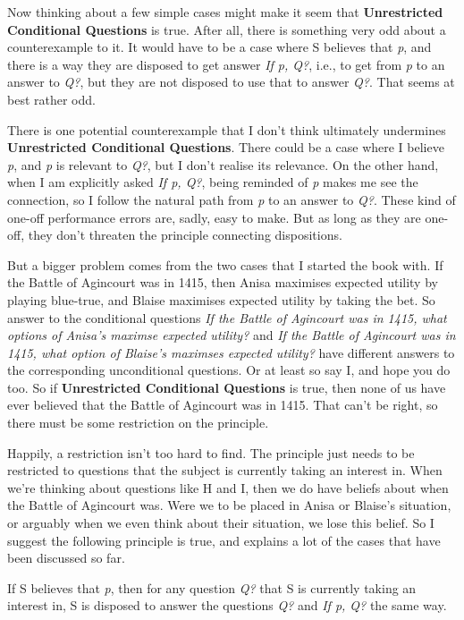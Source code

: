 \documentclass[
  11pt,
]{book}
\providecommand{\tightlist}{%
  \setlength{\itemsep}{0pt}\setlength{\parskip}{0pt}}
\begin{document}
Now thinking about a few simple cases might make it seem that \textbf{Unrestricted Conditional Questions} is true. After all, there is something very odd about a counterexample to it. It would have to be a case where S believes that \emph{p}, and there is a way they are disposed to get answer \emph{If p, Q?}, i.e., to get from \emph{p} to an answer to \emph{Q?}, but they are not disposed to use that to answer \emph{Q?}. That seems at best rather odd.

There is one potential counterexample that I don't think ultimately undermines \textbf{Unrestricted Conditional Questions}. There could be a case where I believe \emph{p}, and \emph{p} is relevant to \emph{Q?}, but I don't realise its relevance. On the other hand, when I am explicitly asked \emph{If p, Q?}, being reminded of \emph{p} makes me see the connection, so I follow the natural path from \emph{p} to an answer to \emph{Q?}. These kind of one-off performance errors are, sadly, easy to make. But as long as they are one-off, they don't threaten the principle connecting dispositions.

But a bigger problem comes from the two cases that I started the book with. If the Battle of Agincourt was in 1415, then Anisa maximises expected utility by playing blue-true, and Blaise maximises expected utility by taking the bet. So answer to the conditional questions \emph{If the Battle of Agincourt was in 1415, what options of Anisa's maximse expected utility?} and \emph{If the Battle of Agincourt was in 1415, what option of Blaise's maximses expected utility?} have different answers to the corresponding unconditional questions. Or at least so say I, and hope you do too. So if \textbf{Unrestricted Conditional Questions} is true, then none of us have ever believed that the Battle of Agincourt was in 1415. That can't be right, so there must be some restriction on the principle.

Happily, a restriction isn't too hard to find. The principle just needs to be restricted to questions that the subject is currently taking an interest in. When we're thinking about questions like H and I, then we do have beliefs about when the Battle of Agincourt was. Were we to be placed in Anisa or Blaise's situation, or arguably when we even think about their situation, we lose this belief. So I suggest the following principle is true, and explains a lot of the cases that have been discussed so far.

\begin{description}
\tightlist
\item[Relevant Conditional Questions]
If S believes that \emph{p}, then for any question \emph{Q?} that S is currently taking an interest in, S is disposed to answer the questions \emph{Q?} and \emph{If p, Q?} the same way.
\end{description}
\end{document}
